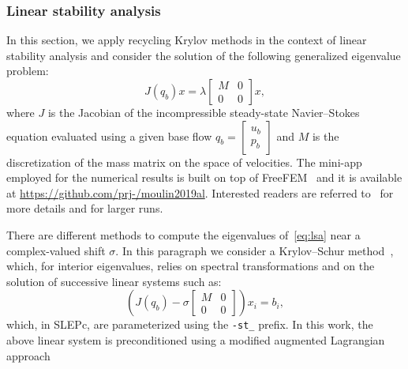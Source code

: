 \documentclass[3p,11pt]{elsarticle}
\newcommand{\pk}[1]{\texttt{#1}}
\begin{document}
    \subsubsection{Linear stability analysis}
In this section, we apply recycling Krylov methods in the context of linear
stability analysis and consider the solution of the following generalized eigenvalue problem:
\begin{equation}\label{eq:lsa}
    J(q_b)x = \lambda \begin{bmatrix}M & 0 \\ 0 & 0 \end{bmatrix} x,
\end{equation}
where $J$ is the Jacobian of the incompressible steady-state Navier--Stokes equation
evaluated using a given base flow $q_b = \begin{bmatrix}u_b \\ p_b\end{bmatrix}$ and
$M$ is the discretization of the mass matrix on the space of velocities.
The mini-app employed for the numerical results is built on top of
FreeFEM~\cite{hecht2012new} and it is available at
\url{https://github.com/prj-/moulin2019al}.
Interested
readers are referred to~\cite{moulin2018al} for more details and for larger
runs.


There are different methods to compute the eigenvalues
of~\cref{eq:lsa} near a complex-valued shift $\sigma$. In this paragraph we consider 
a Krylov--Schur method~\cite{Stewart2002}, which, for interior eigenvalues, relies on spectral transformations
and on the solution of successive linear systems such as:
\begin{equation}\label{eq:ks}
    \left(J(q_b) - \sigma \begin{bmatrix}M&0\\0&0\end{bmatrix}\right)x_i = b_i,
\end{equation}
which, in SLEPc, are parameterized using the \pk{-st\_} prefix.
In this work, the above linear system is preconditioned using a modified augmented Lagrangian
approach~\cite{Benzi2011a,moulin2018al}
\end{document}
